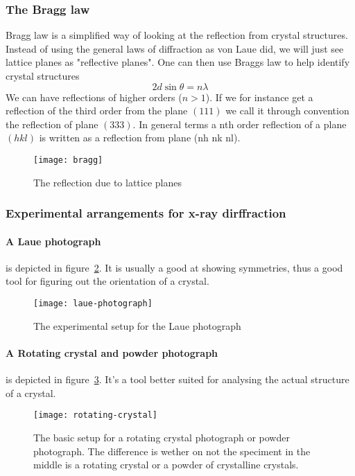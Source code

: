 \documentclass[11pt]{article}
\begin{document}
\subsubsection{The Bragg  law}
Bragg law is a simplified way of looking at the reflection from crystal structures. Instead of using the general laws of diffraction as von Laue did, we will just see lattice planes as "reflective planes". One can then use Braggs law to help identify crystal structures
\begin{equation}
	2d\sin{\theta} = n\lambda
\end{equation}
We can have reflections of higher orders ($n>1$). If we for instance get a reflection of the third order from the plane $(111)$ we call it through convention the reflection of plane $(333)$. In general terms a nth order reflection of a plane $(hkl)$ is written as a reflection from plane (nh nk nl).

\begin{figure}[H]
	\centering
	\texttt{[image: bragg]}
	\caption{The reflection due to lattice planes}
	\label{fig:bragg-law}
\end{figure}

\subsubsection{Experimental arrangements for x-ray dirffraction}
\newpage
\paragraph{A Laue photograph} is depicted in figure~\ref{fig:laue-photograph}. It is usually a good at showing symmetries, thus a good tool for figuring out the orientation of a crystal.
\begin{figure}[!h]
	\centering
	\texttt{[image: laue-photograph]}
	\caption{The experimental setup for the Laue photograph}
	\label{fig:laue-photograph}
\end{figure}

\newpage
\paragraph{A Rotating crystal and powder photograph} is depicted in figure~\ref{fig:rotating-crystal}. It's a tool better suited for analysing the actual structure of a crystal.
\begin{figure}[!h]
	\centering
	\texttt{[image: rotating-crystal]}
	\caption{The basic setup for a rotating crystal photograph or powder photograph. The difference is wether on not the speciment in the middle is a rotating crystal or a powder of crystalline crystals.}
	\label{fig:rotating-crystal}
\end{figure}
\end{document}
